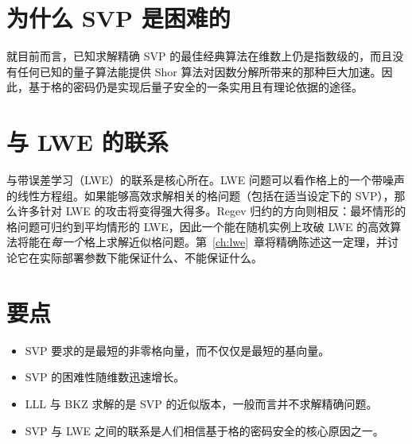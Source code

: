 \section{为什么 SVP 是困难的}

就目前而言，已知求解精确 SVP 的最佳经典算法在维数上仍是指数级的，而且没有任何已知的量子算法能提供 Shor 算法对因数分解所带来的那种巨大加速。因此，基于格的密码仍是实现后量子安全的一条实用且有理论依据的途径。

\section{与 LWE 的联系}

与带误差学习（LWE）的联系是核心所在。LWE 问题可以看作格上的一个带噪声的线性方程组。如果能够高效求解相关的格问题（包括在适当设定下的 SVP），那么许多针对 LWE 的攻击将变得强大得多。Regev 归约的方向则相反：最坏情形的格问题可归约到平均情形的 LWE，因此一个能在随机实例上攻破 LWE 的高效算法将能在\emph{每一个}格上求解近似格问题。第~\ref{ch:lwe}~章将精确陈述这一定理，并讨论它在实际部署参数下能保证什么、不能保证什么。

\section{要点}

\begin{itemize}
    \item SVP 要求的是最短的非零格向量，而不仅仅是最短的基向量。
    \item SVP 的困难性随维数迅速增长。
    \item LLL 与 BKZ 求解的是 SVP 的近似版本，一般而言并不求解精确问题。
    \item SVP 与 LWE 之间的联系是人们相信基于格的密码安全的核心原因之一。
\end{itemize}

\printbibliography[heading=chapterrefs]
